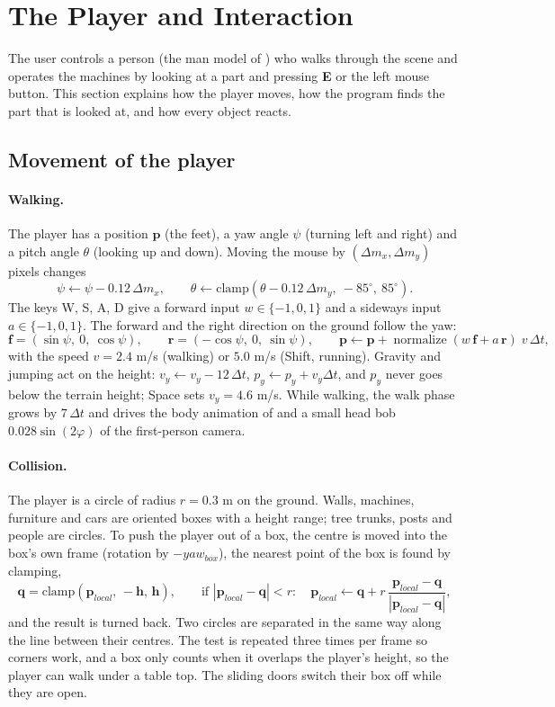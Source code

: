 \section{The Player and Interaction}\label{sec:interaction}
The user controls a person (the man model of ) who walks through the scene and operates the
machines by looking at a part and pressing \textbf{E} or the left mouse button. This section explains how the
player moves, how the program finds the part that is looked at, and how every object reacts.

\subsection{Movement of the player}\label{sec:camera}
\paragraph{Walking.} The player has a position $\mathbf{p}$ (the feet), a yaw angle $\psi$ (turning left and right)
and a pitch angle $\theta$ (looking up and down). Moving the mouse by $(\Delta m_x,\Delta m_y)$ pixels changes
\[
\psi \leftarrow \psi - 0.12\,\Delta m_x,\qquad \theta \leftarrow \mathrm{clamp}(\theta - 0.12\,\Delta m_y,\ -85^\circ,\ 85^\circ).
\]
The keys W, S, A, D give a forward input $w\in\{-1,0,1\}$ and a sideways input $a\in\{-1,0,1\}$. The forward and the
right direction on the ground follow the yaw:
\[
\mathbf{f} = (\sin\psi,\ 0,\ \cos\psi),\qquad \mathbf{r} = (-\cos\psi,\ 0,\ \sin\psi),\qquad
\mathbf{p} \leftarrow \mathbf{p} + \operatorname{normalize}(w\,\mathbf{f} + a\,\mathbf{r})\; v\,\Delta t,
\]
with the speed $v=2.4$ m/s (walking) or $5.0$ m/s (Shift, running). Gravity and jumping act on the height:
$v_y \leftarrow v_y - 12\,\Delta t$, $p_y \leftarrow p_y + v_y\Delta t$, and $p_y$ never goes below the terrain height; Space
sets $v_y=4.6$ m/s. While walking, the walk phase grows by $7\,\Delta t$ and drives the body animation of
 and a small head bob $0.028\sin(2\varphi)$ of the first-person camera.

\paragraph{Collision.} The player is a circle of radius $r=0.3$ m on the ground. Walls, machines, furniture and cars are
oriented boxes with a height range; tree trunks, posts and people are circles. To push the player out of a box, the
centre is moved into the box's own frame (rotation by $-yaw_{box}$), the nearest point of the box is found by clamping,
\[
\mathbf{q}=\mathrm{clamp}(\mathbf{p}_{local},\,-\mathbf{h},\,\mathbf{h}),\qquad
\text{if } |\mathbf{p}_{local}-\mathbf{q}|<r:\quad \mathbf{p}_{local} \leftarrow \mathbf{q} + r\,\frac{\mathbf{p}_{local}-\mathbf{q}}{|\mathbf{p}_{local}-\mathbf{q}|},
\]
and the result is turned back. Two circles are separated in the same way along the line between their centres.
The test is repeated three times per frame so corners work, and a box only counts when it overlaps the player's
height, so the player can walk under a table top. The sliding doors switch their box off while they are open.

